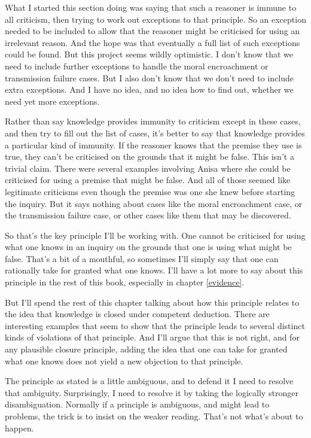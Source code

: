 \documentclass[
  11pt,
]{book}
\begin{document}
What I started this section doing was saying that such a reasoner is immune to all criticism, then trying to work out exceptions to that principle. So an exception needed to be included to allow that the reasoner might be criticised for using an irrelevant reason. And the hope was that eventually a full list of such exceptions could be found. But this project seems wildly optimistic. I don't know that we need to include further exceptions to handle the moral encroachment or transmission failure cases. But I also don't know that we don't need to include extra exceptions. And I have no idea, and no idea how to find out, whether we need yet more exceptions.

Rather than say knowledge provides immunity to criticism except in these cases, and then try to fill out the list of cases, it's better to say that knowledge provides a particular kind of immunity. If the reasoner knows that the premise they use is true, they can't be criticised on the grounds that it might be false. This isn't a trivial claim. There were several examples involving Anisa where she could be criticised for using a premise that might be false. And all of those seemed like legitimate criticisms even though the premise was one she knew before starting the inquiry. But it says nothing about cases like the moral encroachment case, or the transmission failure case, or other cases like them that may be discovered.

So that's the key principle I'll be working with. One cannot be criticised for using what one knows in an inquiry on the grounds that one is using what might be false. That's a bit of a mouthful, so sometimes I'll simply say that one can rationally take for granted what one knows. I'll have a lot more to say about this principle in the rest of this book, especially in chapter \ref{evidence}.

But I'll spend the rest of this chapter talking about how this principle relates to the idea that knowledge is closed under competent deduction. There are interesting examples that seem to show that the principle leads to several distinct kinds of violations of that principle. And I'll argue that this is not right, and for any plausible closure principle, adding the idea that one can take for granted what one knows does not yield a new objection to that principle.

The principle as stated is a little ambiguous, and to defend it I need to resolve that ambiguity. Surprisingly, I need to resolve it by taking the logically stronger disambiguation. Normally if a principle is ambiguous, and might lead to problems, the trick is to insist on the weaker reading. That's not what's about to happen.
\end{document}
